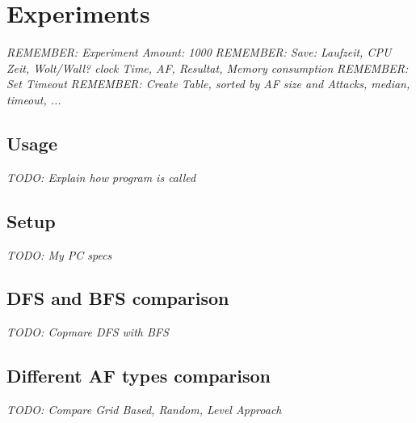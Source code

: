 \chapter{Experiments}
\textit{REMEMBER: Experiment Amount: 1000}
\textit{REMEMBER: Save:  Laufzeit, CPU Zeit, Wolt/Wall? clock Time, AF, Resultat, Memory consumption}
\textit{REMEMBER: Set Timeout}
\textit{REMEMBER: Create Table, sorted by AF size and Attacks, median, timeout, ...}

\section{Usage}
\textit{TODO: Explain how program is called}

\section{Setup}
\textit{TODO: My PC specs}

\section{DFS and BFS comparison}
\textit{TODO: Copmare DFS with BFS}

\section{Different AF types comparison}
\textit{TODO: Compare Grid Based, Random, Level Approach}